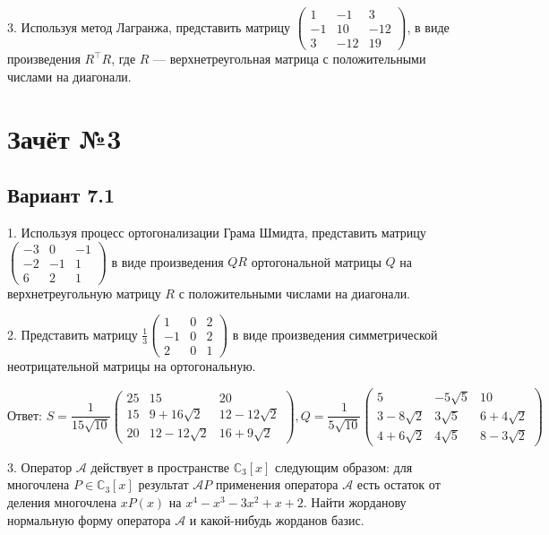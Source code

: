 \documentclass[a4paper]{article}
\def\No{№}
\begin{document}
3. Используя метод Лагранжа, представить матрицу $\left(
\begin{array}{rrr}
1 & -1 & 3 \\
-1 & 10 & -12 \\
3 & -12 & 19
\end{array}
\right)$, в виде произведения $R^\top R$, где $R$ ---
верхнетреугольная матрица с положительными числами на диагонали.

\section{Зачёт \No 3}

\subsection{Вариант 7.1}

1. Используя процесс ортогонализации Грама Шмидта, представить
мат\-ри\-цу $\left(
\begin{array}{rrr}
-3 & 0 & -1 \\
-2 & -1 & 1 \\
6 & 2 & 1
\end{array}
\right) $ в виде произведения $QR$ ортогональной матрицы $Q$ на
верхнетреугольную матрицу $R$ с положительными числами на
диагонали.

2. Представить матрицу $\displaystyle\frac{1}{3}\left(
\begin{array}{rrr}
1 & 0 & 2 \\
-1 & 0 & 2 \\
2 & 0 & 1
\end{array}\right)
$ в виде произведения симметрической неотрицательной матрицы на
ортогональную.

$$
\textit{Ответ:\ } S=\displaystyle\frac{1}{15\sqrt{10}} \left(
\begin{array}{ccc}
25 & 15 & 20 \\
15 & 9+16\sqrt 2 & 12-12\sqrt 2 \\
20 & 12-12\sqrt 2 & 16+9\sqrt 2
\end{array}
\right), Q=\displaystyle\frac{1}{5\sqrt{10}}\left(
\begin{array}{ccc}
5 & -5\sqrt 5 & 10 \\
3-8\sqrt 2 & 3\sqrt 5 & 6+4\sqrt 2 \\
4+6\sqrt 2 & 4\sqrt 5 & 8-3\sqrt 2
\end{array}
\right)
$$

3. Оператор $\mathcal{A}$ действует в пространстве
$\mathbb{C}_3[x]$ следующим образом: для многочлена
$P\in\mathbb{C}_3[x]$ результат $\mathcal{A}P$ применения
оператора $\mathcal{A}$ есть остаток от деления многочлена $xP(x)$
на $x^4-x^3-3x^2+x+2$. Найти жорданову нормальную форму оператора
$\mathcal{A}$ и какой-нибудь жорданов базис.
\end{document}
